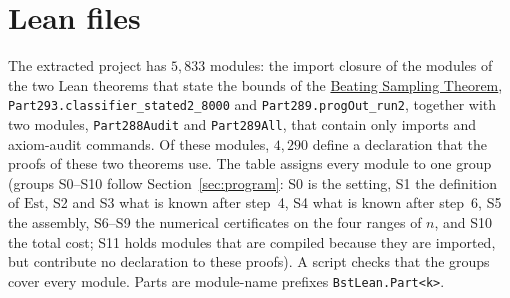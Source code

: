 \documentclass[10pt]{article}
\newcommand{\bst}{\hyperref[thm:main]{Beating Sampling Theorem}}
\newcommand{\Est}{\mathrm{Est}}
\begin{document}
\begin{table}[h]
\centering\small
\sizestable
\caption{The agent and world networks of the \bst{} at $n=8{,}000$, and the MLP blocks of large open-weight transformers, read
from their published configurations (October 2026). The last column counts
the parameters of the whole model: the weights of $A$ and of $W$, and the totals stated
in each model card or release announcement; GLM-5.3's model card states no
total, so its entry is the parameter count that Hugging Face reports for its checkpoint. Kimi K3's routed experts act on a $3{,}584$-dimensional
projection of its $7{,}168$-dimensional embedding, and Muse Spark Open's on a $4{,}096$-dimensional projection of its $8{,}192$-dimensional embedding. The mixture-of-experts
layers have $896$ routed experts of width $3{,}072$ with $16$ used per token
(Kimi K3), $512$ of width $2{,}048$ with $10$ per token (Qwen3.8), $384$ of
width $3{,}072$ with $6$ per token (DeepSeek V4 Pro), $256$ of width $4{,}096$
with $8$ per token (Muse Spark Open) and $256$ of width $2{,}048$ with $8$ per
token (GLM-5.3). All but Muse Spark Open also have one or two shared experts.
The configuration of Muse Spark Open sets no shared experts. The official Muse Spark Open checkpoint is gated, so its figures are from the configuration of a public copy of the checkpoint and from the Transformers implementation.}
\label{tab:sizes-app}
\end{table}

\section{Lean files}\label{app:files}
The extracted project has $5{,}833$ modules: the import closure of the modules of the two Lean theorems that state the bounds of the \bst{}, \texttt{Part293.classifier\_stated2\_8000} and \texttt{Part289.progOut\_run2}, together with two modules, \texttt{Part288Audit} and \texttt{Part289All}, that contain only imports and axiom-audit commands. Of these modules, $4{,}290$ define a declaration that the proofs of these two theorems use. The table assigns every module to one group (groups S0--S10 follow Section~\ref{sec:program}: S0 is the setting, S1 the definition of $\Est$, S2 and S3 what is known after step~4, S4 what is known after step~6, S5 the assembly, S6--S9 the numerical certificates on the four ranges of $n$, and S10 the total cost; S11 holds modules that are compiled because they are imported, but contribute no declaration to these proofs). A script checks that the groups cover every module. Parts are module-name prefixes \texttt{BstLean.Part<k>}.
{\footnotesize

}
\end{document}
